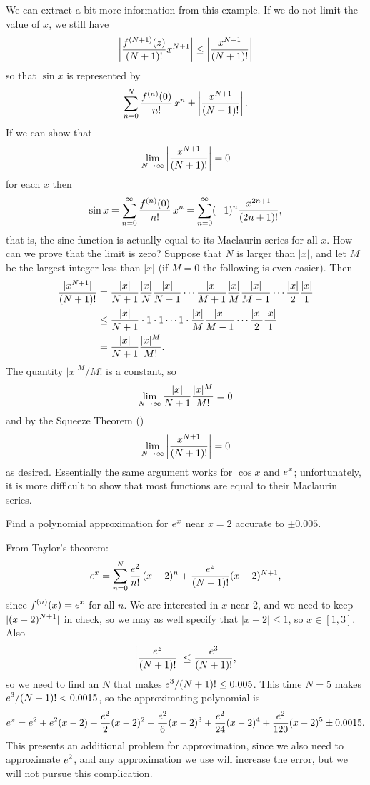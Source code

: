 We can extract a bit more information from this example. If we do not
limit the value of $x$, we still have 
$$
  \left|{f^{(N+1)}(z)\over (N+1)!}x^{N+1}\right|\le 
  \left|{x^{N+1}\over (N+1)!}\right|
$$
so that $\sin x$ is represented by 
$$
  \sum_{n=0}^N{f^{(n)}(0)\over n!}\,x^n \pm 
  \left|{x^{N+1}\over (N+1)!}\right|.
$$
If we can show that 
$$
  \lim_{N\to\infty} \left|{x^{N+1}\over (N+1)!}\right|=0
$$
for each $x$ then 
$$
  \sin x=\sum_{n=0}^\infty{f^{(n)}(0)\over n!}\,x^n
  = \sum_{n=0}^\infty (-1)^n{x^{2n+1}\over (2n+1)!},
$$
that is, the sine function is actually equal to its
Maclaurin series for all $x$. How can we prove that the limit is zero?
Suppose that $N$ is larger than $|x|$, and let $M$ be the largest
integer less than $|x|$ (if $M=0$ the following is even easier). Then
\begin{align*}
  {|x^{N+1}|\over (N+1)!} &= {|x|\over N+1}{|x|\over N}{|x|\over N-1}\cdots
    {|x|\over M+1}{|x|\over M}{|x|\over M-1}\cdots {|x|\over 2}{|x|\over 1} \\
  &\le {|x|\over N+1}\cdot 1\cdot 1\cdots 1\cdot
    {|x|\over M}{|x|\over M-1}\cdots {|x|\over 2}{|x|\over 1} \\
  &={|x|\over N+1}{|x|^M\over M!}.
\end{align*}
The quantity $|x|^M/ M!$ is a constant, so 
$$
  \lim_{N\to\infty} {|x|\over N+1}{|x|^M\over M!} = 0
$$
and by the Squeeze Theorem ()
$$
  \lim_{N\to\infty} \left|{x^{N+1}\over (N+1)!}\right|=0
$$
as desired. Essentially the same argument works for $\cos x$ and $\displaystyle
e^x$; unfortunately, it is more difficult to show that most functions
are equal to their Maclaurin series.

\begin{example} Find a polynomial approximation for $\displaystyle e^x$ near $x=2$
accurate to $\pm
0.005$. 

From Taylor's theorem:
$$
  e^x= \sum_{n=0}^N{e^2\over n!}\,(x-2)^n + 
  {e^z\over (N+1)!}(x-2)^{N+1},
$$
since $\displaystyle f^{(n)}(x)=e^x$ for all $n$. We are interested in $x$ near 2,
and we need to keep $\displaystyle |(x-2)^{N+1}|$ in check, so we may as well
specify that $|x-2|\le 1$, so $x\in[1,3]$. Also
$$\left|{e^z\over (N+1)!}\right|\le {e^3\over (N+1)!},$$
so we need to find an $N$ that makes $\displaystyle e^3/(N+1)!\le 0.005$. This time
$N=5$ makes $\displaystyle e^3/(N+1)!< 0.0015$, so the approximating polynomial is
$$
  e^x=e^2+e^2(x-2)+{e^2\over2}(x-2)^2+{e^2\over6}(x-2)^3+
  {e^2\over24}(x-2)^4+{e^2\over120}(x-2)^5
  \pm 0.0015.
$$
This presents an additional problem for approximation, since we also
need to approximate $\displaystyle e^2$, and any approximation we use will increase
the error, but we will not pursue this complication.
\end{example}

